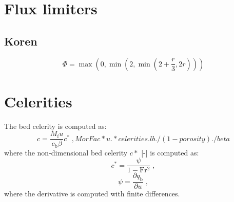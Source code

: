 \documentclass{deltares_report_elv}
\newcommand{\mathsub}[2]{#1_{\mathrm{#2}}}
\newcommand{\Fr}{\mathrm{Fr}}
\begin{document}
\chapter{Flux limiters}
\label{app:flux_lim}

\section{Koren}

\begin{equation}
\Phi=\max\left(0,\min\left(2,\min\left(2+\frac{r}{3},2r\right)\right)\right)
\end{equation}

\chapter{Celerities}
\label{sec:celerities}

The bed celerity is computed as:
\begin{equation}
\label{eq:c_bed}
c=\frac{\mathsub{M}{f}u}{\mathsub{c}{b}\beta}c^{*}\;,
MorFac*u.*celerities.lb./(1-porosity)./beta
\end{equation}
%
where the non-dimensional bed celerity $c*$ [-] is computed as:
\begin{equation}
\label{eq:c_bed_nondim}
c^{*}=\frac{\psi}{1-\Fr{}^2}\;,
\end{equation}
\begin{equation}
\label{eq:psi}
\psi=\frac{\partial \mathsub{q}{b}}{\partial u} \;,
\end{equation}
where the derivative is computed with finite differences. 
\end{document}
